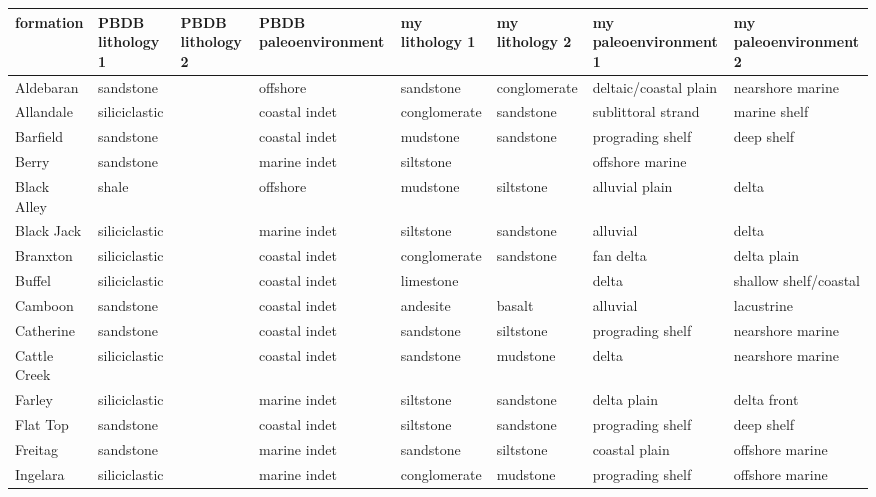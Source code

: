 \begin{sidewaystable}[ht]\tiny
  \centering
  \begin{tabular}{llllllll}
    formation & PBDB lithology 1 & PBDB lithology 2 & PBDB paleoenvironment & my lithology 1 & my lithology 2 & my paleoenvironment 1 & my paleoenvironment 2 \\ 
    \hline
    Aldebaran & sandstone &  & offshore & sandstone & conglomerate & deltaic/coastal plain & nearshore marine \\ 
    Allandale & siliciclastic &  & coastal indet & conglomerate & sandstone & sublittoral strand & marine shelf \\ 
    Barfield & sandstone &  & coastal indet & mudstone & sandstone & prograding shelf & deep shelf \\ 
    Berry & sandstone &  & marine indet & siltstone &  & offshore marine &  \\ 
    Black Alley & shale &  & offshore & mudstone & siltstone & alluvial plain & delta \\ 
    Black Jack & siliciclastic &  & marine indet & siltstone & sandstone & alluvial & delta \\ 
    Branxton & siliciclastic &  & coastal indet & conglomerate & sandstone & fan delta & delta plain \\ 
    Buffel & siliciclastic &  & coastal indet & limestone &  & delta & shallow shelf/coastal \\ 
    Camboon & sandstone &  & coastal indet & andesite & basalt & alluvial & lacustrine \\ 
    Catherine & sandstone &  & coastal indet & sandstone & siltstone & prograding shelf & nearshore marine \\ 
    Cattle Creek & siliciclastic &  & coastal indet & sandstone & mudstone & delta & nearshore marine \\ 
    Farley & siliciclastic &  & marine indet & siltstone & sandstone & delta plain & delta front \\ 
    Flat Top & sandstone &  & coastal indet & siltstone & sandstone & prograding shelf & deep shelf \\ 
    Freitag & sandstone &  & marine indet & sandstone & siltstone & coastal plain & offshore marine \\ 
    Ingelara & siliciclastic &  & marine indet & conglomerate & mudstone & prograding shelf & offshore marine \\ 

\end{tabular}
\end{sidewaystable}
